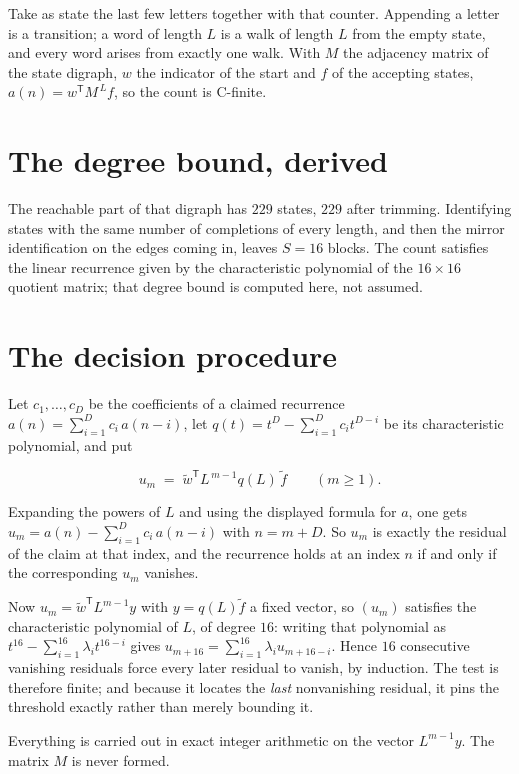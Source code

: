 \documentclass[11pt]{article}
\theoremstyle{definition}
\begin{document}
Take as state the last few letters together with that counter. Appending a letter is a transition; a word of length $L$ is a walk of length $L$ from the empty state, and every word arises from exactly one walk. With $M$ the adjacency matrix of the state digraph, $w$ the indicator of the start and $f$ of the accepting states, $a(n) = w^{\mathsf T}M^{\,L}f$, so the count is C-finite.

\section{The degree bound, derived}

The reachable part of that digraph has $229$ states, $229$ after trimming. Identifying states with the same number of completions of every length, and then the mirror identification on the edges coming in, leaves $S = 16$ blocks. The count satisfies the linear recurrence given by the characteristic polynomial of the $16\times16$ quotient matrix; that degree bound is computed here, not assumed.

\section{The decision procedure}

Let $c_1,\dots,c_D$ be the coefficients of a claimed recurrence $a(n) = \sum_{i=1}^{D} c_i\,a(n-i)$, let $q(t) = t^{D} - \sum_{i=1}^{D} c_i t^{D-i}$ be its characteristic polynomial, and put

\[u_m \;=\; \tilde w^{\mathsf T} L^{\,m-1} q(L)\,\tilde f \qquad (m \ge 1).\]

Expanding the powers of $L$ and using the displayed formula for $a$, one gets $u_m = a(n) - \sum_{i=1}^{D} c_i\,a(n-i)$ with $n = m + D$. So $u_m$ is exactly the residual of the claim at that index, and the recurrence holds at an index $n$ if and only if the corresponding $u_m$ vanishes.

Now $u_m = \tilde w^{\mathsf T} L^{m-1} y$ with $y = q(L)\tilde f$ a fixed vector, so $(u_m)$ satisfies the characteristic polynomial of $L$, of degree $16$: writing that polynomial as $t^{16} - \sum_{i=1}^{16} \lambda_i t^{16-i}$ gives $u_{m+16} = \sum_{i=1}^{16} \lambda_i u_{m+16-i}$. Hence $16$ consecutive vanishing residuals force every later residual to vanish, by induction. The test is therefore finite; and because it locates the {\itshape last} nonvanishing residual, it pins the threshold exactly rather than merely bounding it.

Everything is carried out in exact integer arithmetic on the vector $L^{m-1}y$. The matrix $M$ is never formed.
\end{document}
